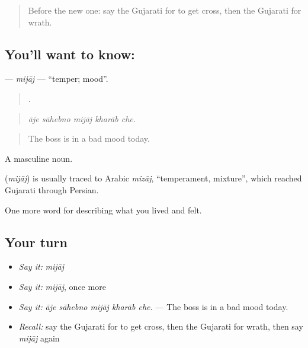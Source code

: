 \label{lesson:GU-C452-mijaj}



\begin{quote}
Before the new one: say the Gujarati for to get cross, then the Gujarati for wrath.
\end{quote}

\subsection*{You'll want to know: }
\textbf{} — \emph{mijāj} — \textquotedblleft{}temper; mood\textquotedblright{}.

\begin{quote}
    .
\end{quote}

\begin{quote}
\emph{āje sāhebno mijāj kharāb che.}
\end{quote}

\begin{quote}
The boss is in a bad mood today.
\end{quote}

A masculine noun.

\begin{cousinweb}
\textbf{} (\emph{mijāj}) is usually traced to Arabic \emph{mizāj}, \textquotedblleft{}temperament, mixture\textquotedblright{}, which reached Gujarati through Persian.
\end{cousinweb}

\begin{grammarlens}[title={What you've built}]
One more word for describing what you lived and felt.
\end{grammarlens}

\subsection*{Your turn}
\begin{itemize}
\raggedright
  \item \emph{Say it:} \emph{mijāj}
  \item \emph{Say it:} \emph{mijāj}, once more
  \item \emph{Say it:} \emph{āje sāhebno mijāj kharāb che.} — The boss is in a bad mood today.
  \item \emph{Recall:} say the Gujarati for to get cross, then the Gujarati for wrath, then say \emph{mijāj} again
\end{itemize}

